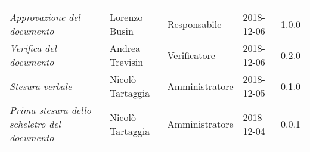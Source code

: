 \newpage 
\section*{}
\begin{table}[H]
	\centering
	\begin{tabular}{p{4cm}|C{3cm}|C{3cm}|R{2.5cm}|R{2cm}}
		
		 & & & & \\
		
		
		\emph{Approvazione del documento} &  Lorenzo Busin & Responsabile & 2018-12-06 & 1.0.0 \\
		\hline
		
		\emph{Verifica del documento} & Andrea Trevisin & Verificatore & 2018-12-06 & 0.2.0 \\
		\hline

		\emph{Stesura verbale} & Nicolò Tartaggia & Amministratore & 2018-12-05 & 0.1.0 \\
		\hline
		
		\emph{Prima stesura dello scheletro del documento} & Nicolò Tartaggia & Amministratore & 2018-12-04 & 0.0.1 \\
		
	\end{tabular}
	
\end{table}


\clearpage